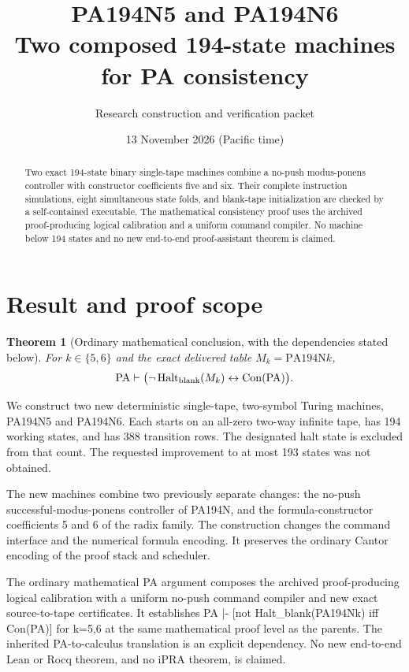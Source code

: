 \documentclass[11pt,letterpaper]{article}
\title{PA194N5 and PA194N6\\Two composed 194-state machines for PA consistency}
\author{Research construction and verification packet}
\date{13 November 2026 (Pacific time)}
\newtheorem{theorem}{Theorem}
\begin{document}
\maketitle
\begin{abstract}
Two exact 194-state binary single-tape machines combine a no-push
modus-ponens controller with constructor coefficients five and six.
Their complete instruction simulations, eight simultaneous state folds,
and blank-tape initialization are checked by a self-contained executable.
The mathematical consistency proof uses the archived proof-producing
logical calibration and a uniform command compiler. No machine below
194 states and no new end-to-end proof-assistant theorem is claimed.
\end{abstract}
\tableofcontents
\bigskip
\section{Result and proof scope}
\begin{theorem}[Ordinary mathematical conclusion, with the dependencies stated below]
For $k\in\{5,6\}$ and the exact delivered table $M_k=\mathrm{PA194N}k$,
\[
 \mathrm{PA}\vdash
 \bigl(\neg\operatorname{Halt}_{\rm blank}(M_k)
       \leftrightarrow \operatorname{Con}(\mathrm{PA})\bigr).
\]
\end{theorem}
We construct two new deterministic single-tape, two-symbol Turing machines, PA194N5 and PA194N6. Each starts on an all-zero two-way infinite tape, has 194 working states, and has 388 transition rows. The designated halt state is excluded from that count. The requested improvement to at most 193 states was not obtained.

The new machines combine two previously separate changes: the no-push successful-modus-ponens controller of PA194N, and the formula-constructor coefficients 5 and 6 of the radix family. The construction changes the command interface and the numerical formula encoding. It preserves the ordinary Cantor encoding of the proof stack and scheduler.

The ordinary mathematical PA argument composes the archived proof-producing logical calibration with a uniform no-push command compiler and new exact source-to-tape certificates. It establishes PA |- [not Halt\_blank(PA194Nk) iff Con(PA)] for k=5,6 at the same mathematical proof level as the parents. The inherited PA-to-calculus translation is an explicit dependency. No new end-to-end Lean or Rocq theorem, and no iPRA theorem, is claimed.
\end{document}

